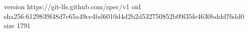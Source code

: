 version https://git-lfs.github.com/spec/v1
oid sha256:6129839f48d7c65a49ce4bd6010d4d2b2d532750852b09f35fe4630bddd76dd0
size 1791
